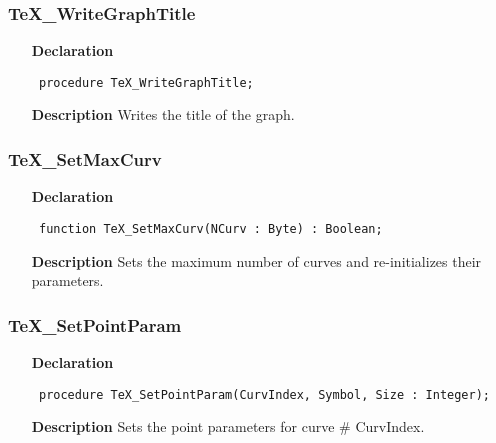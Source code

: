 \documentclass[12pt,a4paper,oneside]{report}
\newcommand{\declarationitem}[1]{\textbf{#1}}
\newcommand{\descriptiontitle}[1]{\textbf{#1}}
\newcommand{\code}[1]{\texttt{#1}}
\begin{document}
\subsubsection{TeX{\_}WriteGraphTitle}
\label{utexplot-TeX_WriteGraphTitle}
\begin{itemize}\item[\declarationitem{Declaration}\hfill]
	\begin{flushleft}
		\code{
			procedure TeX{\_}WriteGraphTitle;}
		
	\end{flushleft}
	
	\par
	\item[\descriptiontitle{Description}]
	Writes the title of the graph.
	
\end{itemize}
\subsubsection{TeX{\_}SetMaxCurv}
\label{utexplot-TeX_SetMaxCurv}
\begin{itemize}\item[\declarationitem{Declaration}\hfill]
	\begin{flushleft}
		\code{
			function TeX{\_}SetMaxCurv(NCurv : Byte) : Boolean;}
		
	\end{flushleft}
	
	\par
	\item[\descriptiontitle{Description}]
	Sets the maximum number of curves and re{-}initializes their parameters.
	
\end{itemize}
\subsubsection{TeX{\_}SetPointParam}
\label{utexplot-TeX_SetPointParam}
\begin{itemize}\item[\declarationitem{Declaration}\hfill]
	\begin{flushleft}
		\code{
			procedure TeX{\_}SetPointParam(CurvIndex, Symbol, Size : Integer);}
		
	\end{flushleft}
	
	\par
	\item[\descriptiontitle{Description}]
	Sets the point parameters for curve {\#} CurvIndex.
	
\end{itemize}
\end{document}
